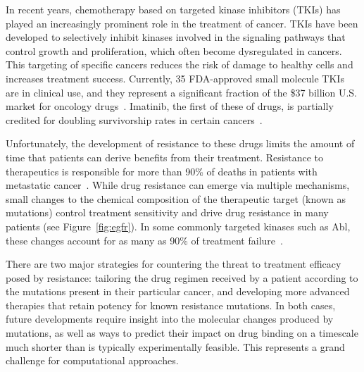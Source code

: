 
In recent years, chemotherapy based on targeted kinase inhibitors (TKIs) has
played an increasingly prominent role in the treatment of cancer. 
TKIs have been developed to selectively inhibit kinases involved in the
signaling pathways that control growth and proliferation, which often become
dysregulated in cancers. This targeting of specific cancers reduces the risk
of damage to healthy cells and increases treatment success. Currently, 
35 FDA-approved small molecule TKIs are in clinical use, and they represent a
significant fraction of the \$37 billion U.S. market for oncology
drugs~\cite{FDA, Zhao2014}. Imatinib, the first of these of drugs, is
partially credited for doubling survivorship rates in certain
cancers~\cite{Zhao2014, ACSreport}.

Unfortunately, the development of resistance to these drugs limits the amount
of time that patients can derive benefits from their treatment. Resistance to
therapeutics is responsible for more than 90\% of deaths in patients with
metastatic cancer~\cite{Longley2005}. While drug resistance can emerge via
multiple mechanisms, small changes to the chemical composition of the
therapeutic target (known as mutations) control treatment sensitivity and
drive drug resistance in many patients (see Figure~\ref{fig:egfr}). In some
commonly targeted kinases such as Abl, these changes account for as many as
90\% of treatment failure~\cite{Shah2002}.


There are two major strategies for countering the threat to treatment
efficacy posed by resistance: tailoring the drug regimen received by a
patient according to the mutations present in their particular cancer, and
developing more advanced %
therapies that retain potency for known resistance mutations. In both cases,
future developments require insight into the molecular changes produced by
mutations, as well as ways to predict their impact on drug binding on a
timescale much shorter than is typically experimentally feasible. This
represents a grand challenge for computational approaches.

